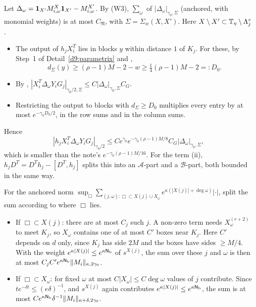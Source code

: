 \begin{detail}
\begin{step}
Let $\Delta_\omega=\mathbf 1_{X'}M^X_{i,\omega}\mathbf 1_{X'}-M^{X'}_{i,\omega}$. By (W3), $\sum_\omega$ of $|\Delta_\omega|_{\gamma_0,\Sigma}$ (anchored, with monomial weights) is at most $C_{\mathfrak N}$, with $\Sigma=\Sigma_w(X,X')$. Here $X\setminus X'\subset\mathbb T_\eta\setminus\Lambda^v_j$.
\begin{itemize}
\item The output of $h_jX_i^T$ lies in blocks $y$ within distance $1$ of $K_j$. For these, by Step~1 of Detail~\ref{d9:parametrix} and ,
\[
d_\Sigma(y)\ge(\rho-1)M-2-w\ge\tfrac14(\rho-1)M-2=:D_0 .
\]
\item By , $|X_i^T\Delta_\omega Y_iG_j|_{\gamma_0/2,\Sigma}\le C|\Delta_\omega|_{\gamma_0,\Sigma}C_G$.
\item Restricting the output to blocks with $d_\Sigma\ge D_0$ multiplies every entry by at most $e^{-\gamma_0D_0/2}$, in the row sums and in the column sums.
\end{itemize}
Hence
\[
|h_jX_i^T\Delta_\omega Y_iG_j|_{\gamma_0/2}\le Ce^{\gamma_0}e^{-\gamma_0(\rho-1)M/8}C_G|\Delta_\omega|_{\gamma_0,\Sigma},
\]
which is smaller than the note's $e^{-\gamma_0(\rho-1)M/16}$. For the term (ii), $h_jD^T=D^Th_j-[D^T,h_j]$ splits this into an $\mathcal A$-part and a $\mathcal B$-part, both bounded in the same way.
\end{step}
\begin{step}[Counting]
For the anchored norm $\sup_\Box\sum_{(j,\omega):\Box\subset X(j)\cup X_\omega}e^{\kappa(|X(j)|+\deg\omega)}|\cdot|$, split the sum according to where $\Box$ lies.
\begin{itemize}
\item If $\Box\subset X(j)$: there are at most $C_j$ such $j$. A non-zero term needs $X_\omega^{(r+2)}$ to meet $K_j$, so $X_\omega$ contains one of at most $C'$ boxes near $K_j$. Here $C'$ depends on $d$ only, since $K_j$ has side $2M$ and the boxes have sides $\ge M/4$. With the weight $e^{\kappa|X(j)|}\le e^{\kappa\mathsf N_{\rm b}}$ of $s^{X(j)}$, the sum over these $j$ and $\omega$ is then at most $C_jC'e^{\kappa\mathsf N_{\rm b}}\|M_i\|_{\kappa,2\gamma_0}$.
\item If $\Box\subset X_\omega$: for fixed $\omega$ at most $C|X_\omega|\le C\deg\omega$ values of $j$ contribute. Since $te^{-\delta t}\le(e\delta)^{-1}$, and $s^{X(j)}$ again contributes $e^{\kappa|X(j)|}\le e^{\kappa\mathsf N_{\rm b}}$, the sum is at most $Ce^{\kappa\mathsf N_{\rm b}}\delta^{-1}\|M_i\|_{\kappa+\delta,2\gamma_0}$.
\end{itemize}

\end{step}
\end{detail}
